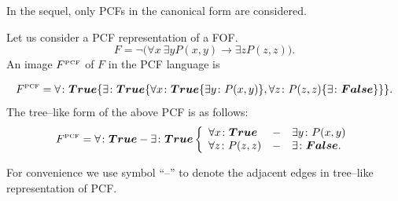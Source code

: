 \documentclass[runningheads,a4paper]{llncs}
\begin{document}
In the sequel, only PCFs in the canonical form are considered.



\begin{example}
Let us consider a PCF representation of a FOF.
$$F= \neg\bigl(\forall x\:\exists y P(x,y)\rightarrow \exists z P(z,z)\bigr).$$
An image $F^{\text{\tiny{PCF}}}$ of $F$ in the PCF language is

$$F^{\text{\tiny{PCF}}} = \forall\colon \boldsymbol{True}\{\exists\colon\boldsymbol{True}\{\forall x\colon\boldsymbol{True}\{\exists y\colon P(x,y)\}, \forall z\colon P(z,z)\{\exists\colon\boldsymbol{False}\}\}\}.$$
The tree--like form of the above PCF is as follows:
$$F^{\text{\tiny{PCF}}} = \forall\colon \boldsymbol{True}-\exists\colon\boldsymbol{True} \left\{
\begin{array}{lcl}
 \forall x\colon\boldsymbol{True} & - & \exists y\colon P(x,y) \\
 \forall z\colon P(z,z) & - & \exists\colon\boldsymbol{False}.
\end{array}
\right.$$
\end{example}
For convenience we use symbol ``--'' to denote the adjacent edges in tree--like representation of PCF.
\end{document}
